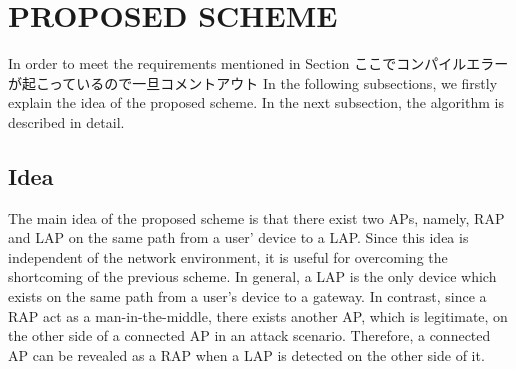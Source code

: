 \documentclass[conference]{IEEEtran}
\begin{document}
\section{PROPOSED SCHEME}
In order to meet the requirements mentioned in Section ここでコンパイルエラーが起こっているので一旦コメントアウト %
In the following subsections, we firstly explain the idea of the proposed scheme.
In the next subsection, the algorithm is described in detail.

\subsection{Idea}
The main idea of the proposed scheme is that there exist two APs, namely, RAP and LAP on the same path from a user' device to a LAP.
Since this idea is independent of the network environment, it is useful for overcoming the shortcoming of the previous scheme.
In general, a LAP is the only device which exists on the same path from a user's device to a gateway.
In contrast, since a RAP act as a man-in-the-middle, there exists another AP, which is legitimate, on the other side of a connected AP in an attack scenario.
Therefore, a connected AP can be revealed as a RAP when a LAP is detected on the other side of it.
\end{document}
